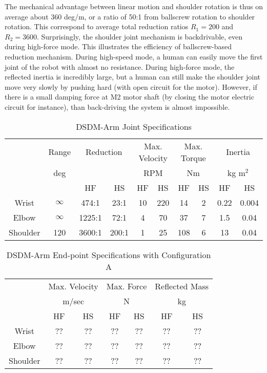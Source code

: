 The mechanical advantage between linear motion and shoulder rotation is thus on average about 360 deg/m, or a ratio of 50:1 from ballscrew rotation to shoulder rotation. This correspond to average total reduction ratios $R_1 = 200 $ and $R_2 = 3600 $. Surprisingly, the shoulder joint mechanism is backdrivable, even during high-force mode. This illustrates the efficiency of ballscrew-based reduction mechanism. During high-speed mode, a human can easily move the first joint of the robot with almost no resistance. During high-force mode, the reflected inertia is incredibly large, but a human can still make the shoulder joint move very slowly by pushing hard (with open circuit for the motor). However, if there is a small damping force at M2 motor shaft (by closing the motor electric circuit for instance), than back-driving the system is almost impossible.   

\begin{table}[htbp]
	\centering
	\caption{DSDM-Arm Joint Specifications}
		\begin{tabular}{ c c c c c c c c c c }
			\hline
			   & Range  & \multicolumn{2}{c}{Reduction} & \multicolumn{2}{c}{Max. Velocity} & \multicolumn{2}{c}{Max. Torque} & \multicolumn{2}{c}{Inertia} \\
			   & deg & & &\multicolumn{2}{c}{RPM} & \multicolumn{2}{c}{Nm} & \multicolumn{2}{c}{kg m$^2$} \\
				\hline 
			  & & HF & HS & HF & HS & HF & HS & HF & HS \\
			\hline
			 Wrist & $\infty$ & 474:1  & 23:1  & 10 & 220 & 14  & 2 & 0.22 & 0.004 \\
			 Elbow & $\infty$ & 1225:1 & 72:1  & 4  & 70  & 37  & 7 & 1.5  & 0.04  \\
			 Shoulder & 120   & 3600:1 & 200:1 & 1  & 25  & 108 & 6 & 13   & 0.04  \\
			\hline
		\end{tabular}
	\label{tab:robotspec}
\end{table}





\begin{table}[htbp]
	\centering
	\caption{DSDM-Arm End-point Specifications with Configuration A}
		\begin{tabular}{ c c c c c c c }
			\hline
			   & \multicolumn{2}{c}{Max. Velocity} & \multicolumn{2}{c}{Max. Force} & \multicolumn{2}{c}{Reflected Mass}\\
			   & \multicolumn{2}{c}{m/sec} & \multicolumn{2}{c}{N} & \multicolumn{2}{c}{kg } \\
				\hline
			  & HF & HS & HF & HS & HF & HS \\
			\hline
			 Wrist    & ?? & ??  & ?? & ?? & ?? & ??    \\
			 Elbow    & ?? & ??  & ?? & ?? & ?? & ??    \\
			 Shoulder & ?? & ??  & ?? & ?? & ?? & ??    \\
			\hline
		\end{tabular}
	\label{tab:robotspec}
\end{table}


